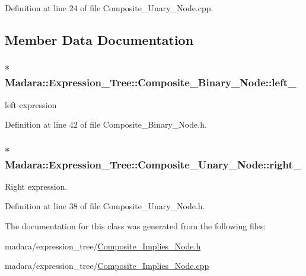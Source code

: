 Definition at line 24 of file Composite\_\-Unary\_\-Node.cpp.



\subsection{Member Data Documentation}
\hypertarget{classMadara_1_1Expression__Tree_1_1Composite__Binary__Node_acac60a70beb2484737e6e7161edb2d1b}{
\subsubsection[{left\_\-}]{$\ast$ {\bf Madara::Expression\_\-Tree::Composite\_\-Binary\_\-Node::left\_\-}}}
\label{df/d55/classMadara_1_1Expression__Tree_1_1Composite__Binary__Node_acac60a70beb2484737e6e7161edb2d1b}


left expression 



Definition at line 42 of file Composite\_\-Binary\_\-Node.h.

\hypertarget{classMadara_1_1Expression__Tree_1_1Composite__Unary__Node_a077b7bd1b52df6f5c6adfde735556a68}{
\subsubsection[{right\_\-}]{$\ast$ {\bf Madara::Expression\_\-Tree::Composite\_\-Unary\_\-Node::right\_\-}}}
\label{d3/dc7/classMadara_1_1Expression__Tree_1_1Composite__Unary__Node_a077b7bd1b52df6f5c6adfde735556a68}


Right expression. 



Definition at line 38 of file Composite\_\-Unary\_\-Node.h.



The documentation for this class was generated from the following files:\begin{DoxyCompactItemize}
\item 
madara/expression\_\-tree/\hyperlink{Composite__Implies__Node_8h}{Composite\_\-Implies\_\-Node.h}\item 
madara/expression\_\-tree/\hyperlink{Composite__Implies__Node_8cpp}{Composite\_\-Implies\_\-Node.cpp}\end{DoxyCompactItemize}
